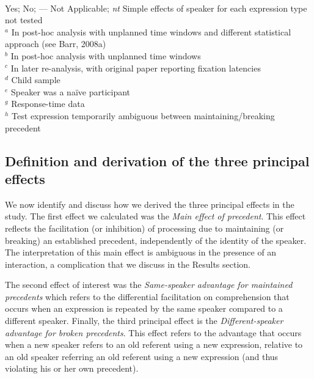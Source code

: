 \documentclass[doc,fignum,apacite,floatsintext]{apa6}
\begin{document}
\begin{table}[htp]
\begin{footnotesize}
\begin{tabular}{lc|rrr|rrr|rrrrrrrr}
\end{tabular}\\
 Yes;  No; {---} Not Applicable; \textit{nt} Simple effects of speaker for each expression type not tested \\
$^a$ In post-hoc analysis with unplanned time windows and different statistical approach (see Barr, 2008a)\\
$^b$ In post-hoc analysis with unplanned time windows\\
$^c$ In later re-analysis, with original paper reporting fixation latencies\\
$^d$ Child sample \\
$^e$ Speaker was a na\"ive participant \\
$^g$ Response-time data \\
$^h$ Test expression temporarily ambiguous between maintaining/breaking precedent
\end{footnotesize}
\end{table}

\subsection{Definition and derivation of the three principal effects}

We now identify and discuss how we derived the three principal effects in the study. The first effect we calculated was the \textit{Main effect of precedent}. This effect reflects the facilitation (or inhibition) of processing due to maintaining (or breaking) an established precedent, independently of the identity of the speaker.  The interpretation of this main effect is ambiguous in the presence of an interaction, a complication that we discuss in the Results section.

The second effect of interest was the \textit{Same-speaker advantage for maintained precedents} which refers to the differential facilitation on comprehension that occurs when an expression is repeated by the same speaker compared to a different speaker. Finally, the third principal effect is the \textit{Different-speaker advantage for broken precedents}. This effect refers to the advantage that occurs when a new speaker refers to an old referent using a new expression, relative to an old speaker referring an old referent using a new expression (and thus violating his or her own precedent).
\end{document}
